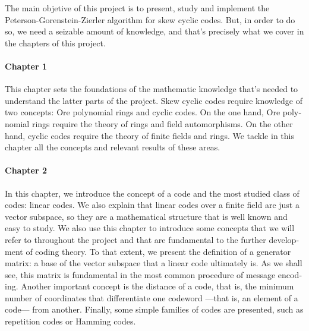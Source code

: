 \begin{otherlanguage}{english}

The main objetive of this project is to present, study and implement the Peterson-Gorenstein-Zierler algorithm for skew cyclic codes.
But, in order to do so, we need a seizable amount of knowledge, and that's precisely what we cover in the chapters of this project.

\paragraph{Chapter 1} This chapter sets the foundations of the mathematic knowledge that's needed to understand the latter parts of the project. 
Skew cyclic codes require knowledge of two concepts: Ore polynomial rings and cyclic codes. 
On the one hand, Ore polynomial rings require the theory of rings and field automorphisms. 
On the other hand, cyclic codes require the theory of finite fields and rings.
We tackle in this chapter all the concepts and relevant results of these areas.

\paragraph{Chapter 2} In this chapter, we introduce the concept of a code and the most studied class of codes: linear codes.
We also explain that linear codes over a finite field are just a vector subspace, so they are a mathematical structure that is well known and easy to study.
We also use this chapter to introduce some concepts that we will refer to throughout the project and that are fundamental to the further development of coding theory.
To that extent, we present the definition of a generator matrix: a base of the vector subspace that a linear code ultimately is.
As we shall see, this matrix is fundamental in the most common procedure of message encoding.
Another important concept is the distance of a code, that is, the minimum number of coordinates that differentiate one codeword —that is, an element of a code— from another.
Finally, some simple families of codes are presented, such as repetition codes or Hamming codes.


\end{otherlanguage}
